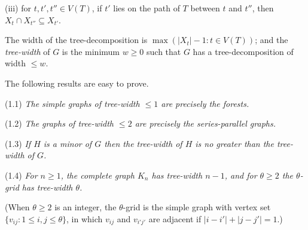 \hspace*{12pt}(iii) for $t, t', t'' \in V(T)$, if $t'$ lies on the path of $T$ between $t$ and $t''$, then $X_t \cap X_{t''} \subseteq X_{t'}$.

The width of the tree-decomposition is $\max(|X_t| - 1 : t \in V(T))$; and the \textit{tree-width} of $G$ is the minimum $w \ge 0$ such that $G$ has a tree-decomposition of width $\le w$.

The following results are easy to prove.

\stmt
(1.1) \textit{The simple graphs of tree-width $\le 1$ are precisely the forests.}

\stmt
(1.2) \textit{The graphs of tree-width $\le 2$ are precisely the series-parallel graphs.}

\stmt
(1.3) \textit{If $H$ is a minor of $G$ then the tree-width of $H$ is no greater than the tree-width of $G$.}

\stmt
(1.4) \textit{For $n \ge 1$, the complete graph $K_n$ has tree-width $n - 1$, and for $\theta \ge 2$ the $\theta$-grid has tree-width $\theta$.}

(When $\theta \ge 2$ is an integer, the $\theta$-grid is the simple graph with vertex set $\{v_{ij} : 1 \le i, j \le \theta\}$, in which $v_{ij}$ and $v_{i'j'}$ are adjacent if $|i - i'| + |j - j'| = 1$.)

